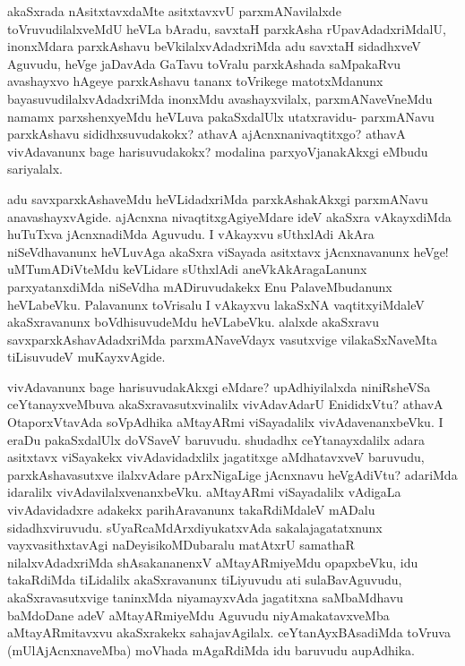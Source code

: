 \begin{artha}
akaSxrada nAsitxtavxdaMte asitxtavxvU parxmANavilalxde toVruvudilalxveMdU heVLa bAradu, savxtaH parxkAsha rUpavAdadxriMdalU, inonxMdara parxkAshavu beVkilalxvAdadxriMda adu savxtaH sidadhxveV Aguvudu, heVge jaDavAda GaTavu toVralu parxkAshada saMpakaRvu avashayxvo hAgeye parxkAshavu tananx toVrikege matotxMdanunx bayasuvudilalxvAdadxriMda inonxMdu avashayxvilalx, parxmANaveVneMdu namamx parxshenxyeMdu heVLuva pakaSxdalUlx utatxravidu- parxmANavu parxkAshavu sididhxsuvudakokx? athavA ajAcnxnanivaqtitxgo? athavA vivAdavanunx bage harisuvudakokx? modalina parxyoVjanakAkxgi eMbudu sariyalalx. 
\end{artha}

\begin{artha}
adu savxparxkAshaveMdu heVLidadxriMda parxkAshakAkxgi parxmANavu anavashayxvAgide. ajAcnxna nivaqtitxgAgiyeMdare ideV akaSxra vAkayxdiMda huTuTxva jAcnxnadiMda Aguvudu. I vAkayxvu sUthxlAdi AkAra niSeVdhavanunx heVLuvAga akaSxra viSayada asitxtavx jAcnxnavanunx heVge! uMTumADiVteMdu keVLidare sUthxlAdi aneVkAkAragaLanunx parxyatanxdiMda niSeVdha mADiruvudakekx Enu PalaveMbudanunx heVLabeVku. Palavanunx toVrisalu I vAkayxvu lakaSxNA vaqtitxyiMdaleV akaSxravanunx boVdhisuvudeMdu heVLabeVku. alalxde akaSxravu savxparxkAshavAdadxriMda parxmANaveVdayx vasutxvige vilakaSxNaveMta tiLisuvudeV muKayxvAgide.
\end{artha}%

\begin{artha}
vivAdavanunx bage harisuvudakAkxgi eMdare? upAdhiyilalxda niniRsheVSa ceYtanayxveMbuva akaSxravasutxvinalilx vivAdavAdarU EnididxVtu? athavA OtaporxVtavAda soVpAdhika aMtayARmi viSayadalilx vivAdavenanxbeVku. I eraDu pakaSxdalUlx doVSaveV baruvudu. shudadhx ceYtanayxdalilx adara asitxtavx viSayakekx vivAdavidadxlilx jagatitxge aMdhatavxveV baruvudu, parxkAshavasutxve ilalxvAdare pArxNigaLige jAcnxnavu heVgAdiVtu? adariMda idaralilx vivAdavilalxvenanxbeVku. aMtayARmi viSayadalilx vAdigaLa vivAdavidadxre adakekx parihAravanunx takaRdiMdaleV mADalu sidadhxviruvudu. sUyaRcaMdArxdiyukatxvAda sakalajagatatxnunx vayxvasithxtavAgi naDeyisikoMDubaralu matAtxrU samathaR nilalxvAdadxriMda shAsakananenxV aMtayARmiyeMdu opapxbeVku, idu takaRdiMda tiLidalilx akaSxravanunx tiLiyuvudu ati sulaBavAguvudu, akaSxravasutxvige taninxMda niyamayxvAda jagatitxna saMbaMdhavu baMdoDane adeV  aMtayARmiyeMdu Aguvudu niyAmakatavxveMba aMtayARmitavxvu akaSxrakekx sahajavAgilalx. ceYtanAyxBAsadiMda toVruva (mUlAjAcnxnaveMba) moVhada mAgaRdiMda idu baruvudu aupAdhika.
\end{artha}

